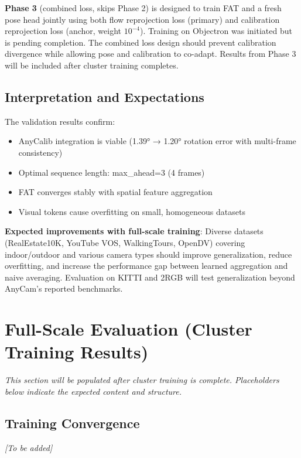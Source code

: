 \textbf{Phase 3} (combined loss, skips Phase 2) is designed to train FAT and a fresh pose head jointly using both flow reprojection loss (primary) and calibration reprojection loss (anchor, weight $10^{-4}$). Training on Objectron was initiated but is pending completion. The combined loss design should prevent calibration divergence while allowing pose and calibration to co-adapt. Results from Phase 3 will be included after cluster training completes.

\subsection{Interpretation and Expectations}\label{sec:validation-interpretation}

The validation results confirm:
\begin{itemize}
    \item AnyCalib integration is viable (1.39° → 1.20° rotation error with multi-frame consistency)
    \item Optimal sequence length: max\_ahead=3 (4 frames)
    \item FAT converges stably with spatial feature aggregation
    \item Visual tokens cause overfitting on small, homogeneous datasets
\end{itemize}

\textbf{Expected improvements with full-scale training}: Diverse datasets (RealEstate10K, YouTube VOS, WalkingTours, OpenDV) covering indoor/outdoor and various camera types should improve generalization, reduce overfitting, and increase the performance gap between learned aggregation and naive averaging. Evaluation on KITTI and 2RGB will test generalization beyond AnyCam's reported benchmarks.

\section{Full-Scale Evaluation (Cluster Training Results)}\label{sec:fullscale-results}

\emph{This section will be populated after cluster training is complete. Placeholders below indicate the expected content and structure.}

\subsection{Training Convergence}\label{sec:training-convergence}

\emph{[To be added]}

